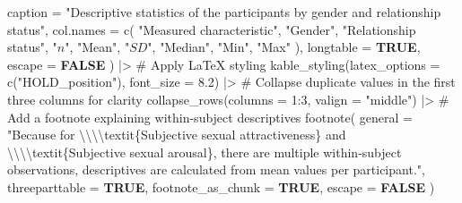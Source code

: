 \documentclass[
  bookmarksnumbered]{article}
\newenvironment{Shaded}{\begin{snugshade}}{\end{snugshade}}
\newcommand{\AttributeTok}[1]{\textcolor[rgb]{0.80,0.80,0.80}{#1}}
\newcommand{\CommentTok}[1]{\textcolor[rgb]{0.50,0.62,0.50}{#1}}
\newcommand{\ConstantTok}[1]{\textcolor[rgb]{0.86,0.64,0.64}{\textbf{#1}}}
\newcommand{\DecValTok}[1]{\textcolor[rgb]{0.86,0.86,0.80}{#1}}
\newcommand{\FloatTok}[1]{\textcolor[rgb]{0.75,0.75,0.82}{#1}}
\newcommand{\FunctionTok}[1]{\textcolor[rgb]{0.94,0.94,0.56}{#1}}
\newcommand{\NormalTok}[1]{\textcolor[rgb]{0.80,0.80,0.80}{#1}}
\newcommand{\SpecialCharTok}[1]{\textcolor[rgb]{0.86,0.64,0.64}{#1}}
\newcommand{\StringTok}[1]{\textcolor[rgb]{0.80,0.58,0.58}{#1}}
\begin{document}
\begin{Shaded}
\begin{Highlighting}[]
    \AttributeTok{caption =} \StringTok{"Descriptive statistics of the participants by gender and relationship status"}\NormalTok{,}
    \AttributeTok{col.names =} \FunctionTok{c}\NormalTok{(}
      \StringTok{"Measured characteristic"}\NormalTok{, }\StringTok{"Gender"}\NormalTok{, }\StringTok{"Relationship status"}\NormalTok{,}
      \StringTok{"$n$"}\NormalTok{, }\StringTok{"Mean"}\NormalTok{, }\StringTok{"$SD$"}\NormalTok{, }\StringTok{"Median"}\NormalTok{, }\StringTok{"Min"}\NormalTok{, }\StringTok{"Max"}
\NormalTok{    ),}
    \AttributeTok{longtable =} \ConstantTok{TRUE}\NormalTok{, }\AttributeTok{escape =} \ConstantTok{FALSE}
\NormalTok{  ) }\SpecialCharTok{|\textgreater{}}
  \CommentTok{\# Apply LaTeX styling}
  \FunctionTok{kable\_styling}\NormalTok{(}\AttributeTok{latex\_options =} \FunctionTok{c}\NormalTok{(}\StringTok{"HOLD\_position"}\NormalTok{), }\AttributeTok{font\_size =} \FloatTok{8.2}\NormalTok{) }\SpecialCharTok{|\textgreater{}}
  \CommentTok{\# Collapse duplicate values in the first three columns for clarity}
  \FunctionTok{collapse\_rows}\NormalTok{(}\AttributeTok{columns =} \DecValTok{1}\SpecialCharTok{:}\DecValTok{3}\NormalTok{, }\AttributeTok{valign =} \StringTok{"middle"}\NormalTok{) }\SpecialCharTok{|\textgreater{}}
  \CommentTok{\# Add a footnote explaining within{-}subject descriptives}
  \FunctionTok{footnote}\NormalTok{(}
    \AttributeTok{general =} \StringTok{"Because for }\SpecialCharTok{\textbackslash{}\textbackslash{}\textbackslash{}\textbackslash{}}\StringTok{textit\{Subjective sexual attractiveness\} and}
\StringTok{           }\SpecialCharTok{\textbackslash{}\textbackslash{}\textbackslash{}\textbackslash{}}\StringTok{textit\{Subjective sexual arousal\}, there are multiple within{-}subject}
\StringTok{           observations, descriptives are calculated from mean values per participant."}\NormalTok{,}
    \AttributeTok{threeparttable =} \ConstantTok{TRUE}\NormalTok{, }\AttributeTok{footnote\_as\_chunk =} \ConstantTok{TRUE}\NormalTok{, }\AttributeTok{escape =} \ConstantTok{FALSE}
\NormalTok{  )}
\end{Highlighting}
\end{Shaded}

\begingroup\fontsize{8.2}{10.2}\selectfont
\end{document}
